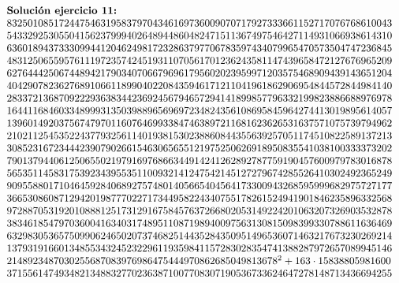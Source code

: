 \documentclass[12pt]{amsart}
\theoremstyle{plain}
\begin{document}
\begin{equation*} \label{solucion2}
\begin{array}{l}
\noindent\textbf{Solución ejercicio 11:} \\
83250108517244754631958379704346169736009070717927333661152717076768610043 \\
54332925305504156237999402648944860482471511367497546427114931066938614310 \\
63601894373330994412046249817232863797706783597434079965470573504747236845 \\
48312506559576111972357424519311070561701236243581147439658472127676965209 \\
62764442506744894217903407066796961795602023959971203575468909439143651204 \\
40429078236276891066118990402208435946171211041961862906954844572844984140 \\
28337213687092229363834423692456794657294141899857796332199823886688976978 \\
16441168460334899931350398896569697234824356108695845964274413019895614057 \\
13960149203756747970116076469933847463897211681623626531637571075739794962 \\
21021125453522437793256114019381530238860844355639257051174510822589137213 \\
30852316723444239079026615463065655121975250626918950835541038100333373202 \\
79013794406125065502197916976866344914241262892787759190457600979783016878 \\
56535114583175392343955351100932141247542145127279674285526410302492365249 \\
90955880171046459284068927574801405665404564173300943268595999682975727177 \\
36653086087129420198777022717344958224340755178261524941901846235896332568 \\
97288705319201088812517312916758457637266802053149224201063207326903532878 \\
38346185479703600416340317489511087198940097563130815098399330788611636469 \\
63298305365750990624650207374682514435284350951496536071463217673230269214 \\
13793191660134855343245232296119359841157283028354741388287972657089945146 \\
2148923487030255687083976986475444970862685049813678 ^2 + 163 \cdot 15838805981600 \\
37155614749348213488327702363871007708307190536733624647278148713436694255 \\

\end{array}
\end{equation*}
\end{document}
